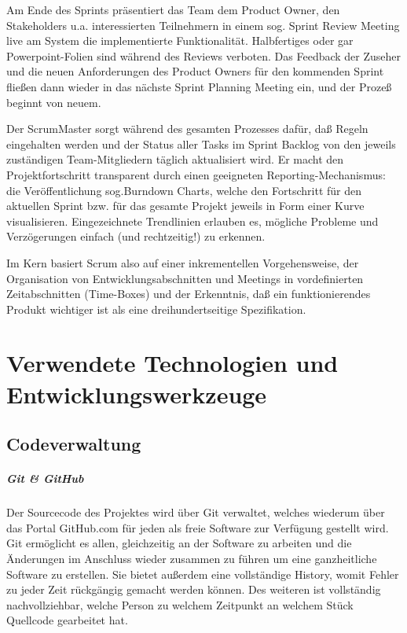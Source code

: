 \documentclass[11pt]{scrreprt}
\begin{document}
Am Ende des Sprints präsentiert das Team dem Product Owner, den Stakeholders u.a. interessierten Teilnehmern in einem sog. Sprint Review Meeting live am System die implementierte Funktionalität. Halbfertiges oder gar Powerpoint-Folien sind während des Reviews verboten. Das Feedback der Zuseher und die neuen Anforderungen des Product Owners für den kommenden Sprint fließen dann wieder in das nächste Sprint Planning Meeting ein, und der Prozeß beginnt von neuem.

Der ScrumMaster sorgt während des gesamten Prozesses dafür, daß Regeln eingehalten werden und der Status aller Tasks im Sprint Backlog von den jeweils zuständigen Team-Mitgliedern täglich aktualisiert wird. Er macht den Projektfortschritt transparent durch einen geeigneten Reporting-Mechanismus: die Veröffentlichung sog.Burndown Charts, welche den Fortschritt für den aktuellen Sprint bzw. für das gesamte Projekt jeweils in Form einer Kurve visualisieren. Eingezeichnete Trendlinien erlauben es, mögliche Probleme und Verzögerungen einfach (und rechtzeitig!) zu erkennen.

Im Kern basiert Scrum also auf einer inkrementellen Vorgehensweise, der Organisation von Entwicklungsabschnitten und Meetings in vordefinierten Zeitabschnitten (Time-Boxes) und der Erkenntnis, daß ein funktionierendes Produkt wichtiger ist als eine dreihundertseitige Spezifikation.

\chapter{Verwendete Technologien und Entwicklungswerkzeuge}
\section{Codeverwaltung}
\paragraph{Git \& GitHub}
Der Sourcecode des Projektes wird über Git verwaltet, welches wiederum über das Portal GitHub.com für jeden als freie Software zur Verf\"ugung gestellt wird.
Git ermöglicht es allen, gleichzeitig an der Software zu arbeiten und die \"Anderungen im Anschluss wieder zusammen zu f\"uhren um eine ganzheitliche Software zu erstellen. Sie bietet außerdem eine vollst\"andige History, womit Fehler zu jeder Zeit r\"uckg\"angig gemacht werden k\"onnen.
Des weiteren ist vollst\"andig nachvollziehbar, welche Person zu welchem Zeitpunkt an welchem St\"uck Quellcode gearbeitet hat.
\end{document}
